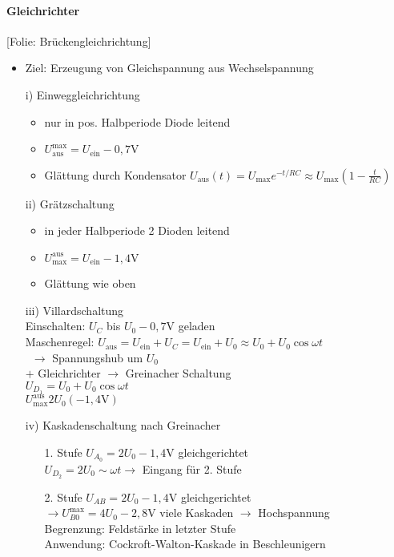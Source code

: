 \documentclass[titlepage,12pt,a4paper,ngerman]{report}
\newcommand{\tx}[1]{\textrm{#1}}
\newcommand{\folie}[1]{\color{gray}[Folie: #1]\color{black}}
\begin{document}
\paragraph{Gleichrichter}
\begin{trivlist}
	\item \folie{Brückengleichrichtung}
\end{trivlist}
\begin{itemize}
	\item Ziel: Erzeugung von Gleichspannung aus Wechselspannung
	\item[i)] Einweggleichrichtung
	\begin{itemize}
		\item nur in pos. Halbperiode Diode leitend
		\item $ U_{\tx{aus}}^{\tx{max}} = U_{\tx{ein}} - 0,7 \tx{V} $
		\item Glättung durch Kondensator $ U_{\tx{aus}}(t) = U_{\tx{max}} e^{-t/RC} \approx U_{\tx{max}} (1- \frac{t}{RC}) $
	\end{itemize}
	\item[ii)] Grätzschaltung
	\begin{itemize}
		\item in jeder Halbperiode 2 Dioden leitend
		\item $ U_{\tx{max}}^{\tx{aus}} = U_{\tx{ein}} - 1,4 \tx{V} $
		\item Glättung wie oben
	\end{itemize}
	\item [iii)] Villardschaltung\\
	Einschalten: $ U_C $ bis $ U_0 -0,7 \tx{V} $ geladen\\
	Maschenregel: $ U_{\tx{aus}} = U_{\tx{ein}} + U_C = U_{\tx{ein}} + U_0 \approx U_0 + U_0 \cos \omega t $\\\
	$ \rightarrow $ Spannungshub um $ U_0 $\\
	$ + $ Gleichrichter $ \rightarrow $ Greinacher Schaltung\\
	$ U_{D_1} = U_0 + U_0 \cos \omega t $\\
	$ U_{\tx{max}}^{\tx{aus}} 2 U_0 (-1,4 \tx{V}) $
	\item[iv)] Kaskadenschaltung nach Greinacher
	\begin{itemize}
		\item[1. Stufe]
		$ U_{A_0} = 2 U_0 -1,4\tx{V} $ gleichgerichtet\\
		$ U_{D_2} = 2 U_0 \sim \omega t \rightarrow $ Eingang für 2. Stufe\\
		\item [2. Stufe]
		$ U_{AB} = 2 U_0 - 1,4 \tx{V} $ gleichgerichtet\\
		$ \rightarrow U_{B0}^{\tx{max}} = 4 U_0 - 2,8 \tx{V} $
		viele Kaskaden $ \rightarrow $ Hochspannung\\
		Begrenzung: Feldstärke in letzter Stufe\\
		Anwendung: Cockroft-Walton-Kaskade in Beschleunigern
	\end{itemize}
\end{itemize}
\end{document}
